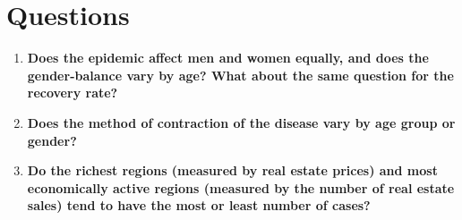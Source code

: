 \documentclass{article}
\begin{document}
\section*{Questions}
\begin{enumerate}
\item
\textbf{Does the epidemic affect men and women equally, and does the gender-balance vary by age?
What about the same
question for the recovery rate?}

\item
\textbf{
Does the method of contraction of the disease vary by age group or gender?
}

\item \textbf{Do the richest regions (measured by real estate prices) and most economically active regions (measured by the number of real estate sales)
tend to have the most or least number of cases?}
\end{enumerate}
\end{document}
